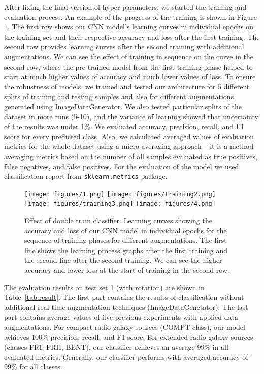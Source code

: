 \documentclass[fleqn,usenatbib]{mnras}
\begin{document}
After fixing the final version of hyper-parameters, we started the training and evaluation process. An example of the progress of the training is shown in Figure \ref{fig:Acc}. The first row shows our CNN model's learning curves in individual epochs on the training set and their respective accuracy and loss after the first training. The second row provides learning curves after the second training with additional augmentations. We can see the effect of training in sequence on the curve in the second row, where the pre-trained model from the first training phase helped to start at much higher values of accuracy and much lower values of loss. To ensure the robustness of models, we trained and tested our architecture for 5 different splits of training and testing samples and also for different augmentations generated using ImageDataGenerator. We also tested particular splits of the dataset in more runs (5-10), and the variance of learning showed that uncertainty of the results was under 1\%. We evaluated accuracy, precision, recall, and F1 score for every predicted class. Also, we calculated averaged values of evaluation metrics for the whole dataset using a micro averaging approach – it is a method averaging metrics based on the number of all samples evaluated as true positives, false negatives, and false positives. For the evaluation of the model we used classification report from \texttt{sklearn.metrics} package.

\begin{figure}
    \centering
    \texttt{[image: figures/1.png]}
    \texttt{[image: figures/training2.png]}
     \texttt{[image: figures/training3.png]}
    \texttt{[image: figures/4.png]}
    \caption{Effect of double train classifier. Learning curves showing the accuracy and loss of our CNN model in individual epochs for the sequence of training phases for different augmentations. The first line shows the learning process graphs after the first training and the second line after the second training. We can see the higher accuracy and lower loss at the start of training in the second row.}
    \label{fig:Acc}
\end{figure}

 The evaluation results  on test set 1 (with rotation) are shown in Table~\ref{tab:result}. The first part contains the results of classification without additional real-time augmentation techniques (ImageDataGenetator). The last part contains average values of five previous experiments with applied data augmentations. For compact radio galaxy sources (COMPT class), our model achieves 100\% precision, recall, and F1 score. For extended radio galaxy sources (classes FRI, FRII, BENT), our classifier achieves an average 99\% in all evaluated metrics. Generally, our classifier performs with averaged accuracy of 99\% for all classes. 
\end{document}
